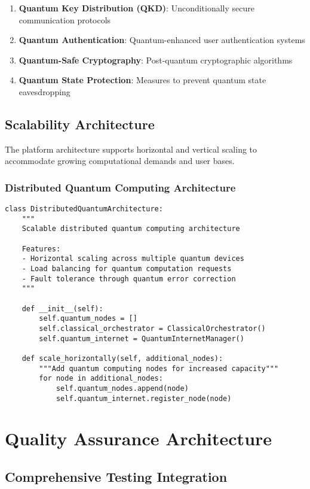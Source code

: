 \documentclass[12pt,a4paper]{report}
\begin{document}
\begin{enumerate}
\item \textbf{Quantum Key Distribution (QKD)}: Unconditionally secure communication protocols
\item \textbf{Quantum Authentication}: Quantum-enhanced user authentication systems
\item \textbf{Quantum-Safe Cryptography}: Post-quantum cryptographic algorithms
\item \textbf{Quantum State Protection}: Measures to prevent quantum state eavesdropping
\end{enumerate}

\subsection{Scalability Architecture}

The platform architecture supports horizontal and vertical scaling to accommodate growing computational demands and user bases.

\subsubsection{Distributed Quantum Computing Architecture}

\begin{lstlisting}
class DistributedQuantumArchitecture:
    """
    Scalable distributed quantum computing architecture

    Features:
    - Horizontal scaling across multiple quantum devices
    - Load balancing for quantum computation requests
    - Fault tolerance through quantum error correction
    """

    def __init__(self):
        self.quantum_nodes = []
        self.classical_orchestrator = ClassicalOrchestrator()
        self.quantum_internet = QuantumInternetManager()

    def scale_horizontally(self, additional_nodes):
        """Add quantum computing nodes for increased capacity"""
        for node in additional_nodes:
            self.quantum_nodes.append(node)
            self.quantum_internet.register_node(node)
\end{lstlisting}

\section{Quality Assurance Architecture}

\subsection{Comprehensive Testing Integration}
\end{document}
